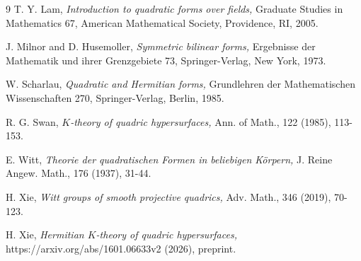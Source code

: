 \documentclass[psamsfonts]{amsart}
\theoremstyle{plain}
\theoremstyle{theorem}
\theoremstyle{definition}
\begin{document}
\begin{thebibliography}{9}
T. Y. Lam, 
{\it Introduction to quadratic forms over fields,\/}
Graduate Studies in Mathematics 67, American Mathematical Society, Providence, RI, 2005.

J. Milnor and D. Husemoller, 
{\it Symmetric bilinear forms,\/}
Ergebnisse der Mathematik und ihrer Grenzgebiete 73, Springer-Verlag, New York, 1973.

W. Scharlau,
{\it Quadratic and Hermitian forms,\/}
Grundlehren der Mathematischen Wissenschaften 270, Springer-Verlag, Berlin, 1985.

R. G. Swan,
{\it $K$-theory of quadric hypersurfaces,\/}
Ann. of Math., 122 (1985), 113-153.

E. Witt, 
{\it Theorie der quadratischen Formen in beliebigen K\"orpern,\/} 
J. Reine Angew. Math., 176 (1937), 31-44.

H. Xie,
{\it Witt groups of smooth projective quadrics,\/}
Adv. Math., 346 (2019), 70-123. 

H. Xie,
{\it Hermitian $K$-theory of quadric hypersurfaces,\/}
https://arxiv.org/abs/1601.06633v2 (2026), preprint.
		
	\end{thebibliography}
	
\end{document}
